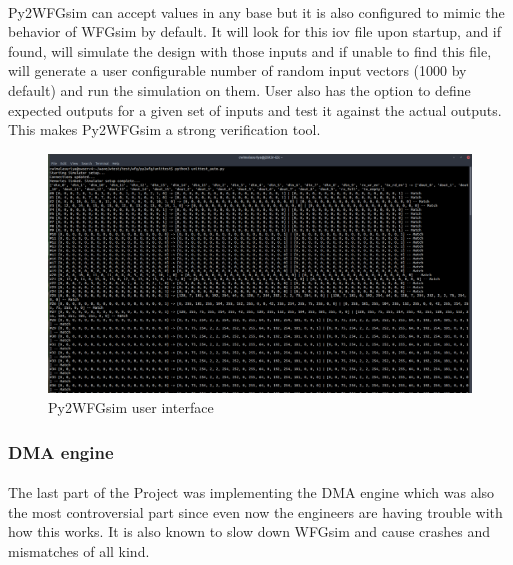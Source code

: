 \paragraph{}
Py2WFGsim can accept values in any base but it is also configured to mimic the behavior of WFGsim by default. It will look for this iov file upon startup, and if found, will simulate the design with those inputs and if unable to find this file, will generate a user configurable number of random input vectors (1000 by default) and run the simulation on them. User also has the option to define expected outputs for a given set of inputs and test it against the actual outputs. This makes Py2WFGsim a strong verification tool.

\begin{figure}[H]
    \centering
    \includegraphics[trim=0cm 0cm 0cm 0cm, clip=true,scale=0.3]{figures/sim_result.png}
    \caption{Py2WFGsim user interface\label{Fig:simresult}}\vspace{-4mm}
    \end{figure}

\subsubsection{DMA engine}
\paragraph{}
The last part of the Project was implementing the DMA engine which was also the most controversial part since even now the engineers are having trouble with how this works. It is also known to slow down WFGsim and cause crashes and mismatches of all kind.

